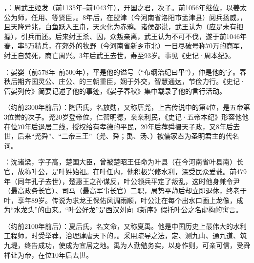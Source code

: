 ，：周武王姬发（前1135年--前1043年），开国之君，次子。前1056年继位，以姜太公为师，任用、等贤臣，。8年后，在盟津（今河南省洛阳市孟津县）阅兵扬威，，且天降异兆，白鱼跃入王舟，天火化为赤鸦。诸侯都说，武王认为（应是未有把握），引兵而还。后来纣王杀、囚，众叛亲离，武王认为不可不伐，遂于前1046年春，率5万精兵，在郊外的牧野（今河南省新乡市北）一日尽破号称70万的商军，纣王自焚死，商亡周兴。3年后武王去世，寿至93岁。事见《史记·周本纪》。

：晏婴（前578年--前500年），平是他的谥号（“布纲治纪曰平”），仲是他的字。春秋后期齐国灵公、庄公、的三朝重臣，娴于外交，智慧通达，节俭力行。《史记·管晏列传》简要记述了他的事迹，《晏子春秋》集中载录了他的言行活动。

（约前2300年前后）：陶唐氏，名放勋，又称唐尧，上古传说中的第4位，是五帝第3位喾的次子。尧20岁登帝位，仁智明德，亲亲利民，《史记·五帝本纪》形容他他在位70年后退居二线，授权给有孝德的平民，20年后荐舜摄天子政，又8年后去世，后来“尧舜”、“二帝三王”（尧、舜；禹、汤、）被儒家奉为圣明君主的代名词。

：沈诸梁，字子高，楚国大臣，曾被楚昭王任命为叶县（在今河南省叶县南）长官，故称叶公，是叶姓始祖。在叶任内，他积极兴修水利，深受民众爱戴。前479年（同年孔子去世），楚惠王之孙谋反，叶公领兵平定了叛乱，这时他身兼令尹（最高政务长官）、司马（最高军事长官）二职，局势平静后却立即退休，终老于叶，享年89岁。传说为求龙王保佑风调雨顺，叶公让在每个出水口画上龙像，成为“水龙头”的由来。“叶公好龙”是西汉刘向《新序》假托叶公之名虚构的寓言。

（约前2100年前后）：夏后氏，名文命，又称夏禹。他是中国历史上最伟大的水利工程师，时受举荐，治理肆虐天下的，。采用疏导之法，定、测九山、通九道、筑九堤，终告成功，使成为宜居之地。禹为人勤勉务实，以身作则，可亲可信，受舜禅让为帝，在位10年后去世。

